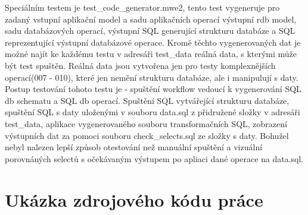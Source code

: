 \documentclass[11pt,twoside,a4paper]{book}
\begin{document}
Speciálním testem je test\_code\_generator.mwe2, tento test vygeneruje pro
zadaný vstupní aplikační model a sadu aplikačních operací výstupní rdb model, sadu
databázových operací, výstupní SQL generující strukturu databáze a SQL
reprezentující výstupní databázové operace. Kromě těchto vygenerovaných dat je
možné najít ke každému testu v adresáři test\_data reálná data, s kterými může
být test spuštěn. Reálná data jsou vytvořena jen pro testy komplexnějších
operací(007 - 010), které jen nemění strukturu databáze, ale i manipulují s
daty. Postup testování tohoto testu je - spuštění workflow vedoucí k
vygenerování SQL db schematu a SQL db operací. Spuštění SQL vytvářející
strukturu databáze, spuštění SQL s daty uloženými v souboru data.sql z
přidružené složky v adresáři test\_data, aplikace vygenerovaného souboru
transformačních SQL, zobrazení výstupních dat za pomoci souboru
check\_selects.sql ze složky s daty. Bohužel nebyl nalezen lepší způsob
otestování než manuální spuštění a vizuální porovnáných selectů s očekávaným
výstupem po apliaci dané operace na data.sql.

\chapter{Ukázka zdrojového kódu práce}



\end{document}
